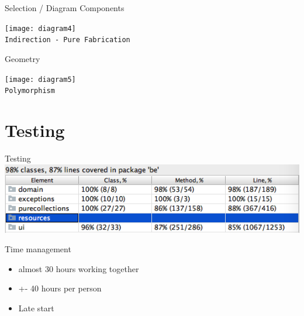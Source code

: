 \documentclass[10pt]{beamer}
\begin{document}
\begin{frame}[fragile]{Selection / Diagram Components}
\begin{center}
\texttt{[image: diagram4]}
\vspace{0.5cm}\\\texttt{Indirection - Pure Fabrication}
\end{center}
\end{frame}

\begin{frame}[fragile]{Geometry}
	\begin{center}
	\texttt{[image: diagram5]}
	\vspace{0.5cm}\\\texttt{Polymorphism}
	\end{center}
\end{frame}

\section{Testing}

\begin{frame}[fragile]{Testing}
\includegraphics[width=1\textwidth]{coverage}
\end{frame}

%

\begin{frame}[fragile]{Time management}
\begin{itemize}
\item almost 30 hours working together
\item +- 40 hours per person
\item Late start
\end{itemize}
\end{frame}

\end{document}
